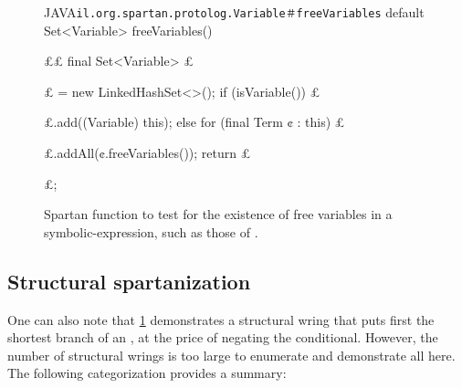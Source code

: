 \begin{figure}
  \caption{\label{figure:free}%
    Spartan function to test for the existence of free variables in a
    symbolic-expression, such as those of \protect\Prolog.
  }
\begin{Code}{JAVA}{\scriptsize\texttt{il.org.spartan.protolog.Variable＃freeVariables}}
default Set<Variable> freeVariables() {££
  final Set<Variable> £\ignore$£$ = new LinkedHashSet<>();
  if (isVariable())
   £\ignore$£$.add((Variable) this);
  else
    for (final Term ¢ : this)
     £\ignore$£$.addAll(¢.freeVariables());
  return £\ignore$£$;
}
\end{Code}
\end{figure}

\subsection{Structural spartanization}
\label{section:wrings}

\newlength{}

One can also note that \cref{figure:free} demonstrates
  a structural wring that puts first the shortest branch of 
  an , at the price of negating the conditional.
However, the number of structural wrings is too large to enumerate and
demonstrate all here. The following categorization provides a summary:

